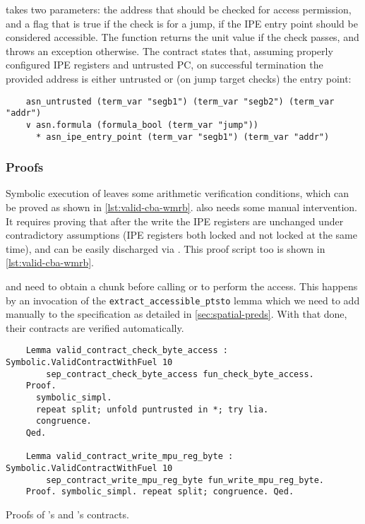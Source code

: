  takes two parameters: the address that should be checked for access permission, and a flag that is true if the check is for a jump, \ie if the IPE entry point should be considered accessible. The function returns the unit value if the check passes, and throws an exception otherwise. The contract states that, assuming properly configured IPE registers and untrusted PC, on successful termination the provided address is either untrusted or (on jump target checks) the entry point:
\begin{verbatim}
    asn_untrusted (term_var "segb1") (term_var "segb2") (term_var "addr")
    ∨ asn.formula (formula_bool (term_var "jump"))
      * asn_ipe_entry_point (term_var "segb1") (term_var "addr")
\end{verbatim}

\subsubsection{Proofs}

Symbolic execution of  leaves some arithmetic verification conditions, which can be proved as shown in \cref{lst:valid-cba-wmrb}.  also needs some manual intervention. It requires proving that after the write the IPE registers are unchanged under contradictory assumptions (IPE registers both locked and not locked at the same time), and can be easily discharged via . This proof script too is shown in \cref{lst:valid-cba-wmrb}.

 and  need to obtain a  chunk before calling  or  to perform the access. This happens by an invocation of the \texttt{extract\_ac\-ces\-si\-ble\_ptsto} lemma which we need to add manually to the \usail specification as detailed in \cref{sec:spatial-preds}. With that done, their contracts are verified automatically.

\begin{listing}[h]
  \begin{verbatim}
    Lemma valid_contract_check_byte_access : Symbolic.ValidContractWithFuel 10
        sep_contract_check_byte_access fun_check_byte_access.
    Proof.
      symbolic_simpl.
      repeat split; unfold puntrusted in *; try lia.
      congruence.
    Qed.

    Lemma valid_contract_write_mpu_reg_byte : Symbolic.ValidContractWithFuel 10
        sep_contract_write_mpu_reg_byte fun_write_mpu_reg_byte.
    Proof. symbolic_simpl. repeat split; congruence. Qed.
  \end{verbatim}
  \caption{Proofs of 's and 's contracts.}
  \label{lst:valid-cba-wmrb}
\end{listing}

